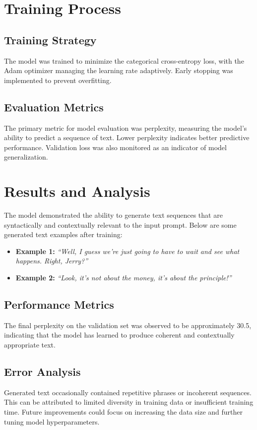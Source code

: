 \documentclass{article}
\begin{document}
\section{Training Process}
\subsection{Training Strategy}
The model was trained to minimize the categorical cross-entropy loss, with the Adam optimizer managing the learning rate adaptively. Early stopping was implemented to prevent overfitting.

\subsection{Evaluation Metrics}
The primary metric for model evaluation was perplexity, measuring the model's ability to predict a sequence of text. Lower perplexity indicates better predictive performance. Validation loss was also monitored as an indicator of model generalization.

\section{Results and Analysis}
The model demonstrated the ability to generate text sequences that are syntactically and contextually relevant to the input prompt. Below are some generated text examples after training:

\begin{itemize}
    \item \textbf{Example 1:} \textit{``Well, I guess we’re just going to have to wait and see what happens. Right, Jerry?''}
    \item \textbf{Example 2:} \textit{``Look, it’s not about the money, it’s about the principle!''}
\end{itemize}

\subsection{Performance Metrics}
The final perplexity on the validation set was observed to be approximately 30.5, indicating that the model has learned to produce coherent and contextually appropriate text.

\subsection{Error Analysis}
Generated text occasionally contained repetitive phrases or incoherent sequences. This can be attributed to limited diversity in training data or insufficient training time. Future improvements could focus on increasing the data size and further tuning model hyperparameters.
\end{document}
